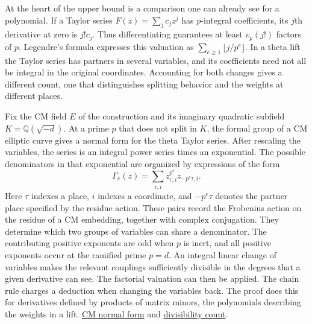 \documentclass[11pt,letterpaper]{article}
\newcommand{\sref}[2]{\href{https://github.com/VladimirReshetnikov/ProveIt/blob/d8415e76ad850651f8c0083afe689dd9f4a45a10/Analysis/GeneralizedRiemannHypothesis/vendor/grh-lean/grh/src/#1.lean}{#2}}
\newcommand{\upperref}[2]{\sref{#1}{#2}}
\begin{document}
At the heart of the upper bound is a comparison one can already see for a polynomial. If a Taylor series $F(z)=\sum_j c_jz^j$ has $p$-integral coefficients, its $j$th derivative at zero is $j!c_j$. Thus differentiating guarantees at least $v_p(j!)$ factors of $p$. Legendre's formula expresses this valuation as $\sum_{e\geq1}\lfloor j/p^e\rfloor$. In a theta lift the Taylor series has partners in several variables, and its coefficients need not all be integral in the original coordinates. Accounting for both changes gives a different count, one that distinguishes splitting behavior and the weights at different places.

Fix the CM field $E$ of the construction and its imaginary quadratic subfield $K=\mathbb Q(\sqrt{-d})$. At a prime $p$ that does not split in $K$, the formal group of a CM elliptic curve gives a normal form for the theta Taylor series. After rescaling the variables, the series is an integral power series times an exponential. The possible denominators in that exponential are organized by expressions of the form
\[
  \Gamma_e(z)=\sum_{\tau,i}z_{\tau,i}^{p^e}z_{-p^e\tau,i}.
\]
Here $\tau$ indexes a place, $i$ indexes a coordinate, and $-p^e\tau$ denotes the partner place specified by the residue action. These pairs record the Frobenius action on the residue of a CM embedding, together with complex conjugation. They determine which two groups of variables can share a denominator. The contributing positive exponents are odd when $p$ is inert, and all positive exponents occur at the ramified prime $p=d$. An integral linear change of variables makes the relevant couplings sufficiently divisible in the degrees that a given derivative can see. The factorial valuation can then be applied. The chain rule charges a deduction when changing the variables back. The proof does this for derivatives defined by products of matrix minors, the polynomials describing the weights in a lift. \upperref{New/Derivatives/FormalGroup/ThetaProducts}{CM normal form} and \upperref{New/Derivatives/Divisibility/Count}{divisibility count}.
\end{document}

